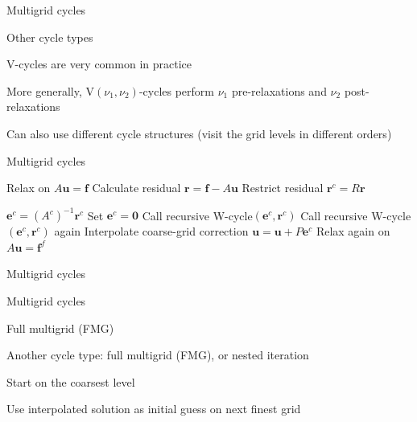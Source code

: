 \documentclass[18pt,xcolor=table]{beamer}
\begin{document}
\begin{frame}{Multigrid cycles}
\begin{block}{Other cycle types}
\bit
\item V-cycles are very common in practice
\item More generally, V$(\nu_1, \nu_2)$-cycles perform $\nu_1$ pre-relaxations and $\nu_2$ post-relaxations
\item Can also use different cycle structures (visit the grid levels in different orders)
\eit
\end{block}
\end{frame}

\begin{frame}{Multigrid cycles}
\begin{algorithm}[H]
\caption{Recursive W-cycle$(\mathbf{u},\mathbf{f})$}
\begin{algorithmic}
\State Relax on $A\mathbf{u} = \mathbf{f}$
\State Calculate residual $\mathbf{r} = \mathbf{f} - A\mathbf{u}$
\State Restrict residual $\mathbf{r}^c = R\mathbf{r}$

\State $\mathbf{e}^c = (A^c)^{-1}\mathbf{r}^c$
\Else
\State Set $\mathbf{e}^c = \mathbf{0}$
\State Call recursive W-cycle$(\mathbf{e}^c, \mathbf{r}^c)$
\State Call recursive W-cycle$(\mathbf{e}^c, \mathbf{r}^c)$ again
\EndIf
\State Interpolate coarse-grid correction $\mathbf{u} = \mathbf{u} + P\mathbf{e}^c$
\State Relax again on $A\mathbf{u} = \mathbf{f}^f$
\end{algorithmic}
\end{algorithm}
\end{frame}

\begin{frame}{Multigrid cycles}
\begin{center}
\end{center}
\end{frame}

\begin{frame}{Multigrid cycles}
\begin{block}{Full multigrid (FMG)}
\bit
\item Another cycle type: full multigrid (FMG), or nested iteration
\item Start on the coarsest level
\item Use interpolated solution as initial guess on next finest grid
\eit
\end{block}
\end{frame}
\end{document}
